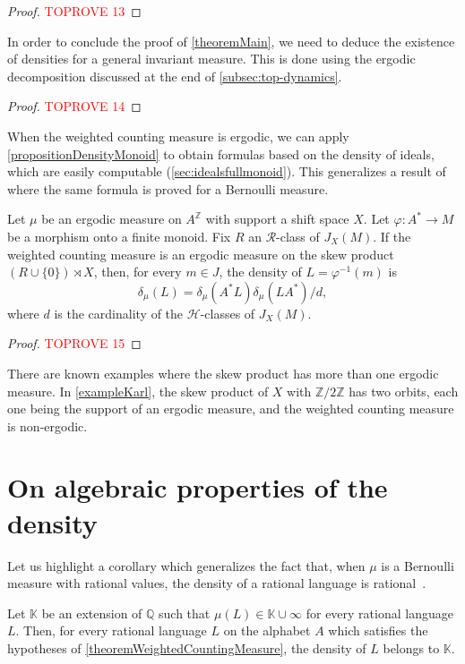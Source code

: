 \documentclass[a4paper,UKenglish,numberwithinsect,cleveref]{lipics-v2021}
\newcommand{\HH}{\mathrel{\mathscr{H}}}
\newcommand{\RR}{\mathrel{\mathscr{R}}}
\newcommand{\Z}{\mathbb{Z}}
\newcommand{\Q}{\mathbb{Q}}
\newcommand{\K}{\mathbb{K}}
\begin{document}
\begin{proof}\textcolor{red}{TOPROVE 13}\end{proof}

In order to conclude the proof of \cref{theoremMain}, we need to deduce the existence
of densities for a general invariant measure. This is done using the ergodic decomposition
discussed at the end of \cref{subsec:top-dynamics}. 
\begin{proof}\textcolor{red}{TOPROVE 14}\end{proof}

When the weighted counting measure is ergodic, we can apply
\cref{propositionDensityMonoid} to obtain formulas based on the density of ideals, which are easily computable (\cref{sec:idealsfullmonoid}). This generalizes a result of \cite{BerstelPerrinReutenauer2009} where the same formula is proved for a Bernoulli measure. 
\begin{theorem}\label{theoremWeightedCountingMeasure}
 Let $\mu$ be an ergodic measure on $A^\Z$ with support a shift space $X$. Let $\varphi\colon A^*\to M$ be a morphism onto a finite monoid.  Fix $R$ an $\RR$-class of $J_X(M)$.  If the weighted counting measure is an ergodic measure on the skew product $(R\cup\{0\})\rtimes X$, then, for every $m\in J$, the density of $L=\varphi^{-1}(m)$ is
  \begin{equation}
   \delta_\mu(L)=\delta_\mu(A^*L)\delta_\mu(LA^*)/d,\label{eqDensity}
  \end{equation}
    where $d$ is the cardinality of the $\HH$-classes of $J_X(M)$.
\end{theorem}

\begin{proof}\textcolor{red}{TOPROVE 15}\end{proof}

There are known examples where the skew product has more than one ergodic measure. In \cref{exampleKarl}, the skew product of $X$ with $\Z/2\Z$ has two orbits, each one being the support of an ergodic measure, and the weighted counting measure is non-ergodic.

\section{On algebraic properties  of the density} 
\label{sec:algebraic}
Let us highlight a corollary which generalizes the fact that, when $\mu$ is a Bernoulli measure with rational values, the density of a rational language is rational~\cite{Berstel1972}. 
\begin{corollary}\label{corollaryExtensionField}
    Let $\K$ be an extension of $\Q$ such that $\mu(L)\in \K\cup\infty$ for
    every rational language $L$. Then, for every rational language $L$ on the alphabet $A$
    which satisfies the hypotheses of \cref{theoremWeightedCountingMeasure}, the
    density of $L$ belongs to $\K$.
\end{corollary}
\end{document}
